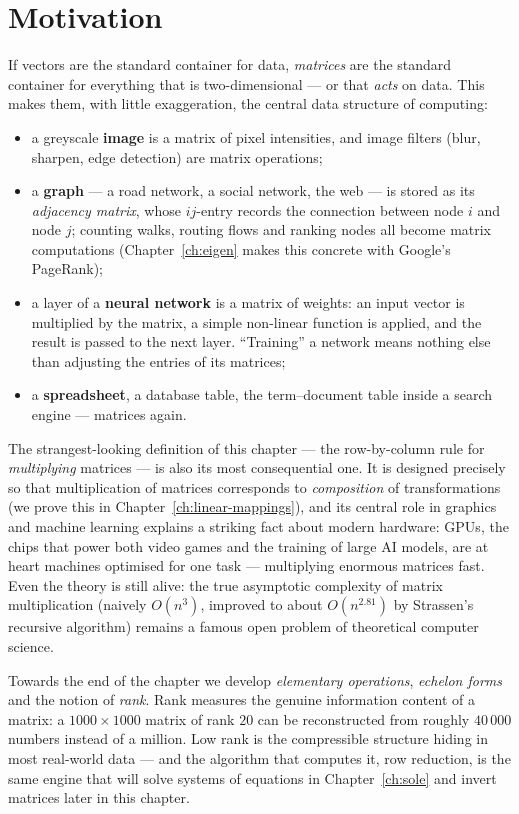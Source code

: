 \section{Motivation}

If vectors are the standard container for data, \emph{matrices} are the standard container for everything
that is two-dimensional — or that \emph{acts} on data. This makes them, with little exaggeration, the
central data structure of computing:

\begin{itemize}
\item a greyscale \textbf{image} is a matrix of pixel intensities, and image filters (blur, sharpen, edge
detection) are matrix operations;
\item a \textbf{graph} — a road network, a social network, the web — is stored as its \emph{adjacency
matrix}, whose $ij$-entry records the connection between node $i$ and node $j$; counting walks, routing
flows and ranking nodes all become matrix computations (Chapter~\ref{ch:eigen} makes this concrete with
Google's PageRank);
\item a layer of a \textbf{neural network} is a matrix of weights: an input vector is multiplied by the
matrix, a simple non-linear function is applied, and the result is passed to the next layer.
``Training'' a network means nothing else than adjusting the entries of its matrices;
\item a \textbf{spreadsheet}, a database table, the term--document table inside a search engine — matrices
again.
\end{itemize}

The strangest-looking definition of this chapter — the row-by-column rule for \emph{multiplying} matrices —
is also its most consequential one. It is designed precisely so that multiplication of matrices corresponds
to \emph{composition} of transformations (we prove this in Chapter~\ref{ch:linear-mappings}), and its
central role in graphics and machine learning explains a striking fact about modern hardware: GPUs, the
chips that power both video games and the training of large AI models, are at heart machines optimised for
one task — multiplying enormous matrices fast. Even the theory is still alive: the true asymptotic
complexity of matrix multiplication (naively $O(n^3)$, improved to about $O(n^{2.81})$ by Strassen's
recursive algorithm) remains a famous open problem of theoretical computer science.

Towards the end of the chapter we develop \emph{elementary operations}, \emph{echelon forms} and the
notion of \emph{rank}. Rank measures the genuine information content of a matrix: a $1000\times 1000$
matrix of rank $20$ can be reconstructed from roughly $40\,000$ numbers instead of a million. Low rank is
the compressible structure hiding in most real-world data — and the algorithm that computes it, row
reduction, is the same engine that will solve systems of equations in Chapter~\ref{ch:sole} and invert
matrices later in this chapter.

